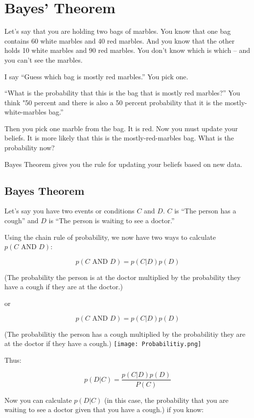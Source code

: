 \chapter{Bayes' Theorem}

Let's say that you are holding two bags of marbles.
You know that one bag contains 60 white marbles and 40 red marbles. And you
know that the other holds 10 white marbles and 90 red marbles. You
don't know which is which -- and you can't see the marbles.

I say ``Guess which bag is mostly red marbles.'' You pick one.

``What is the probability that this is the bag that is mostly red marbles?''
 You think "50 percent and there is
also a 50 percent probability that it is the mostly-white-marbles bag.''

Then you pick one marble from the bag. It is red. Now you must
update your beliefs. It is more likely that this is the
mostly-red-marbles bag. What is the probability now?

Bayes Theorem gives you the rule for updating your beliefs based on
new data.

\section{Bayes Theorem}

Let's say you have two events or conditions $C$ and $D$. $C$ is
``The person has a cough'' and $D$ is ``The person is waiting to see a doctor.''

Using the chain rule of probability, we now have two ways to calculate $p(C \text{ AND } D)$:

$$p(C \text{ AND } D) = p(C | D) p(D)$$

(The probability the person is at the doctor multiplied by the probability they have a cough if they are at the doctor.)

or 

$$p(C \text{ AND } D) = p(C | D) p(D)$$

(The probabilitiy the person has a cough multiplied by the probabilitiy they are at the doctor if they have a cough.)
\texttt{[image: Probabilitiy.png]}

Thus:

$$p(D | C) = \frac {p(C | D)p(D)}{P(C)}$$

Now you can calculate $p(D | C)$ (in this case, the probability that
you are waiting to see a doctor given that you have a cough.) if you
know:

